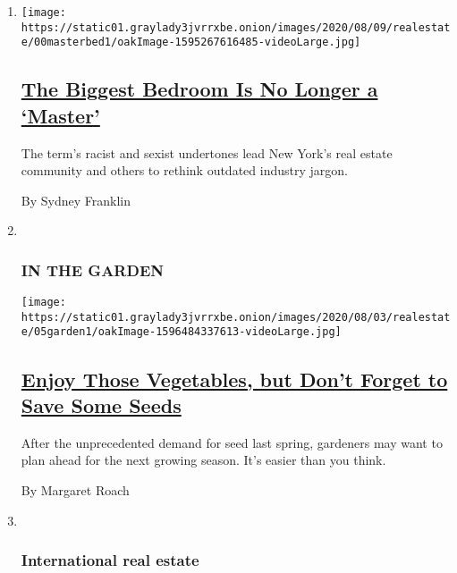 \begin{enumerate}
\def\labelenumi{\arabic{enumi}.}
\item
  \texttt{[image: https://static01.graylady3jvrrxbe.onion/images/2020/08/09/realestate/00masterbed1/oakImage-1595267616485-videoLarge.jpg]}

  \hypertarget{the-biggest-bedroom-is-no-longer-a-master}{%
  \subsection{\texorpdfstring{\href{/2020/08/05/realestate/master-bedroom-change.html}{The
  Biggest Bedroom Is No Longer a
  `Master'}}{The Biggest Bedroom Is No Longer a `Master'}}\label{the-biggest-bedroom-is-no-longer-a-master}}

  The term's racist and sexist undertones lead New York's real estate
  community and others to rethink outdated industry jargon.

  By Sydney Franklin
\item ~
  \hypertarget{in-the-garden}{%
  \subsubsection{IN THE GARDEN}\label{in-the-garden}}

  \texttt{[image: https://static01.graylady3jvrrxbe.onion/images/2020/08/03/realestate/05garden1/oakImage-1596484337613-videoLarge.jpg]}

  \hypertarget{enjoy-those-vegetables-but-dont-forget-to-save-some-seeds}{%
  \subsection{\texorpdfstring{\href{/2020/08/05/realestate/garden-vegetables-save-seeds-build-supply.html}{Enjoy
  Those Vegetables, but Don't Forget to Save Some
  Seeds}}{Enjoy Those Vegetables, but Don't Forget to Save Some Seeds}}\label{enjoy-those-vegetables-but-dont-forget-to-save-some-seeds}}

  After the unprecedented demand for seed last spring, gardeners may
  want to plan ahead for the next growing season. It's easier than you
  think.

  By Margaret Roach
\item ~
  \hypertarget{international-real-estate}{%
  \subsubsection{International real
  estate}\label{international-real-estate}}


\end{enumerate}
